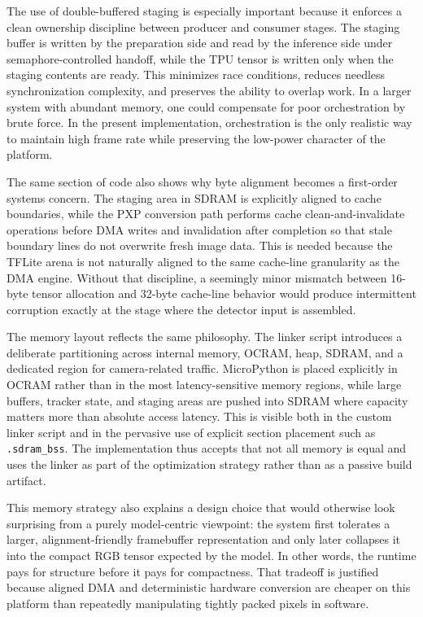 The use of double-buffered staging is especially important because it
enforces a clean ownership discipline between producer and consumer
stages. The staging buffer is written by the preparation side and read
by the inference side under semaphore-controlled handoff, while the TPU
tensor is written only when the staging contents are ready. This
minimizes race conditions, reduces needless synchronization complexity,
and preserves the ability to overlap work. In a larger system with
abundant memory, one could compensate for poor orchestration by brute
force. In the present implementation, orchestration is the only
realistic way to maintain high frame rate while preserving the low-power
character of the platform.

The same section of code also shows why byte alignment becomes a
first-order systems concern. The staging area in SDRAM is explicitly
aligned to cache boundaries, while the PXP conversion path performs
cache clean-and-invalidate operations before DMA writes and invalidation
after completion so that stale boundary lines do not overwrite fresh
image data. This is needed because the TFLite arena is not naturally
aligned to the same cache-line granularity as the DMA engine. Without
that discipline, a seemingly minor mismatch between 16-byte tensor
allocation and 32-byte cache-line behavior would produce intermittent
corruption exactly at the stage where the detector input is assembled.

The memory layout reflects the same philosophy. The linker script
introduces a deliberate partitioning across internal memory, OCRAM,
heap, SDRAM, and a dedicated region for camera-related traffic.
MicroPython is placed explicitly in OCRAM rather than in the most
latency-sensitive memory regions, while large buffers, tracker state,
and staging areas are pushed into SDRAM where capacity matters more than
absolute access latency. This is visible both in the custom linker
script and in the pervasive use of explicit section placement such as
\texttt{.sdram\_bss}. The implementation thus accepts that not all
memory is equal and uses the linker as part of the optimization strategy
rather than as a passive build artifact.

This memory strategy also explains a design choice that would otherwise
look surprising from a purely model-centric viewpoint: the system first
tolerates a larger, alignment-friendly framebuffer representation and
only later collapses it into the compact RGB tensor expected by the
model. In other words, the runtime pays for structure before it pays for
compactness. That tradeoff is justified because aligned DMA and
deterministic hardware conversion are cheaper on this platform than
repeatedly manipulating tightly packed pixels in software.

